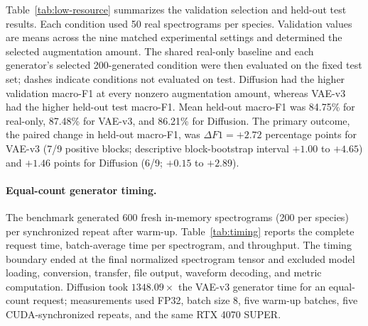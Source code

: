 \documentclass{article}
\begin{document}
Table~\ref{tab:low-resource} summarizes the validation selection and held-out
test results. Each condition used 50 real spectrograms per species. Validation values are
means across the nine matched experimental settings and determined the selected
augmentation amount. The shared real-only baseline and each generator's
selected 200-generated condition were then evaluated on the fixed test set;
dashes indicate conditions not evaluated on test. Diffusion had the higher
validation macro-F1 at every nonzero augmentation amount,
whereas VAE-v3 had the higher held-out test macro-F1. Mean held-out macro-F1 was
84.75\% for real-only, 87.48\% for VAE-v3, and 86.21\% for Diffusion. The
primary outcome, the paired change in held-out macro-F1, was
$\Delta F1=+2.72$ percentage points for VAE-v3 (7/9 positive blocks; descriptive
block-bootstrap interval $+1.00$ to $+4.65$) and $+1.46$ points for Diffusion
(6/9; $+0.15$ to $+2.89$).

\paragraph{Equal-count generator timing.}
The benchmark generated 600 fresh in-memory spectrograms (200 per species) per
synchronized repeat after warm-up. Table~\ref{tab:timing} reports the complete
request time, batch-average time per spectrogram, and throughput. The timing
boundary ended at the final normalized spectrogram tensor and excluded model
loading, conversion, transfer, file output, waveform decoding, and metric
computation. Diffusion took $1348.09\times$ the VAE-v3 generator time for an
equal-count request; measurements used FP32, batch size 8, five warm-up batches,
five CUDA-synchronized repeats, and the same RTX 4070 SUPER.

\begin{table}[!ht]
  \caption{Generator-only timing comparison for matched fresh outputs.}
  \label{tab:timing}
  \centering
  \small
\end{table}
\end{document}
